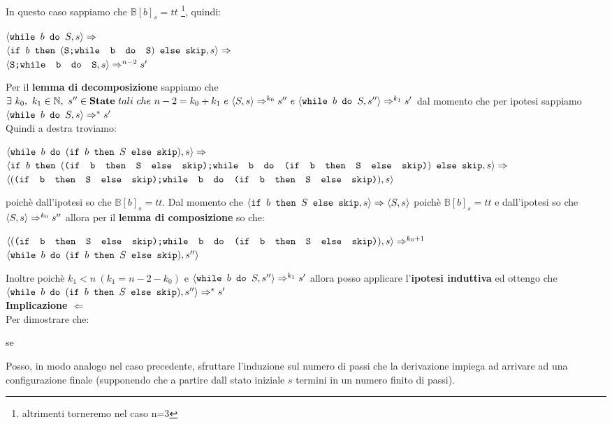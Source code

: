 {	 In questo caso sappiamo che $\mathbb{B}[b]_s=tt$
	\footnote{altrimenti torneremo nel caso n=3}, quindi:
	\begin{center}
	$\confSs{\wbS{b}{S}}{s}\Rar{}$\\
	$\confSs{
		\ifABC{b}
			{(\concat{S}{\wbS{b}{S}})}
			{\skipistr}
	}{s}\Rar{}$\\
	$\confSs{\concat{S}{\wbS{b}{S}}}{s}\Rar{n-2}s'$
	\end{center}
	Per il \textbf{lemma di decomposizione} sappiamo che 
	$\exists{}~k_0,~k_1\in\mathbb{N},~s''\in\states~tali~che~n-2=k_0+k_1~e~
	\confSs{S}{s}\Rar{k_0}s''~e~\confSs{\wbS{b}{S}}{s''}\Rar{k_1}s'$ dal
	momento che per ipotesi sappiamo $\confSs{\wbS{b}{S}}{s}\Rar{*}s'$\\
	Quindi a destra troviamo:
	\begin{center}
	$\confSs{\wbS{b}{(\ifABC{b}{S}{\skipistr})}}{s}\Rar{}$\\
	$\confSs{
		\ifABC{b}
		{(\concat{(\ifABC{b}{S}{\skipistr})}
		{\wbS{b}{(\ifABC{b}{S}{\skipistr})}})}
		{\skipistr}}{s}\Rar{}$\\
	$\confSs{
		{(\concat{(\ifABC{b}{S}{\skipistr})}
		{\wbS{b}{(\ifABC{b}{S}{\skipistr})}})}
	}{s}$
	\end{center}
	poichè dall'ipotesi so che $\mathbb{B}[b]_s=tt$. Dal momento che 
	$\confSs{\ifABC{b}{S}{\skipistr}}{s}\Rar{}\confSs{S}{s}$ poichè
	$\mathbb{B}[b]_s=tt$ e dall'ipotesi so che $\confSs{S}{s}\Rar{k_0}s''$
	allora per il \textbf{lemma di composizione} so che:
	\begin{center}
	$\confSs{
		{(\concat{(\ifABC{b}{S}{\skipistr})}
		{\wbS{b}{(\ifABC{b}{S}{\skipistr})}})}
	}{s}\Rar{k_0+1}$\\
	$\confSs{\wbS{b}{(\ifABC{b}{S}{\skipistr})}}{s''}$
	\end{center}
	Inoltre poichè $k_1<n~(k_1=n-2-k_0)$ e $\confSs{\wbS{b}{S}}{s''}\Rar{k_1}s'$
	allora posso applicare l'\textbf{ipotesi induttiva} ed ottengo che
	$\confSs{\wbS{b}{(\ifABC{b}{S}{\skipistr})}}{s''}\Rar{*}s'$\\

	\textbf{Implicazione $\Longleftarrow{}$} \\
	Per dimostrare che:
	\begin{center}
	se \exFourRtL{}
	\end{center}
	Posso, in modo analogo nel caso precedente, sfruttare l'induzione sul
	numero di passi che la derivazione \exFourRS{} impiega ad arrivare ad una
	configurazione finale (supponendo che a partire dall stato iniziale $s$
	termini in un numero finito di passi).\\

}
